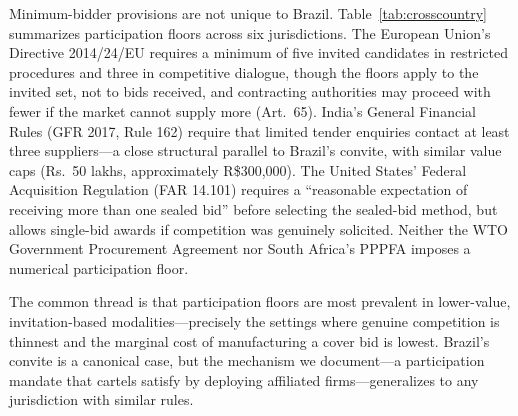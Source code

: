 Minimum-bidder provisions are not unique to Brazil.
Table~\ref{tab:crosscountry} summarizes participation floors across
six jurisdictions. The European Union's Directive 2014/24/EU
requires a minimum of five invited candidates in restricted
procedures and three in competitive dialogue, though the floors
apply to the invited set, not to bids received, and contracting
authorities may proceed with fewer if the market cannot supply more
(Art.~65). India's General Financial Rules (GFR 2017, Rule 162)
require that limited tender enquiries contact at least three
suppliers---a close structural parallel to Brazil's convite, with
similar value caps (Rs.~50 lakhs, approximately R\$300,000).
The United States' Federal Acquisition Regulation (FAR 14.101)
requires a ``reasonable expectation of receiving more than one
sealed bid'' before selecting the sealed-bid method, but allows
single-bid awards if competition was genuinely solicited. Neither
the WTO Government Procurement Agreement nor South Africa's PPPFA
imposes a numerical participation floor.

The common thread is that participation floors are most prevalent
in lower-value, invitation-based modalities---precisely the settings
where genuine competition is thinnest and the marginal cost of
manufacturing a cover bid is lowest. Brazil's convite is a
canonical case, but the mechanism we document---a participation
mandate that cartels satisfy by deploying affiliated
firms---generalizes to any jurisdiction with similar rules.

